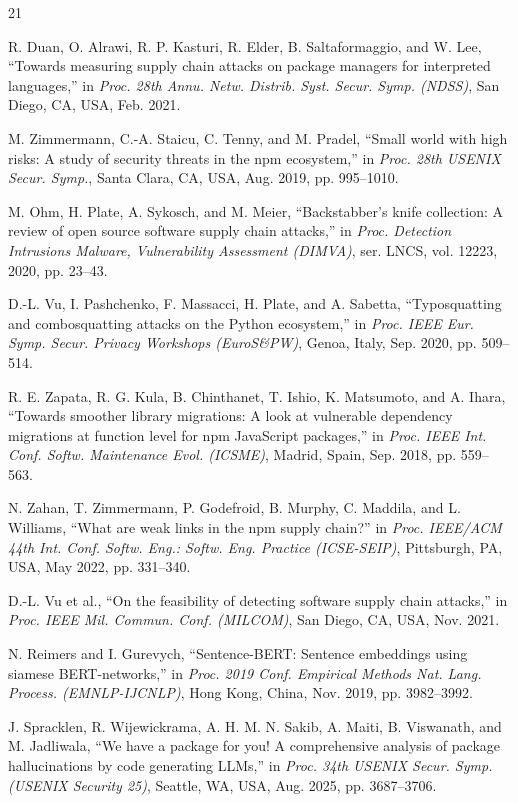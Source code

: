 \documentclass[journal]{IEEEtran}
\begin{document}
\begin{thebibliography}{21}

 R. Duan, O. Alrawi, R. P. Kasturi, R. Elder, B. Saltaformaggio, and W. Lee, ``Towards
measuring supply chain attacks on package managers for interpreted languages,'' in \emph{Proc. 28th Annu.
Netw. Distrib. Syst. Secur. Symp. (NDSS)}, San Diego, CA, USA, Feb. 2021.

 M. Zimmermann, C.-A. Staicu, C. Tenny, and M. Pradel, ``Small world with high
risks: A study of security threats in the npm ecosystem,'' in \emph{Proc. 28th USENIX Secur. Symp.}, Santa
Clara, CA, USA, Aug. 2019, pp. 995--1010.

 M. Ohm, H. Plate, A. Sykosch, and M. Meier, ``Backstabber's knife collection: A review of
open source software supply chain attacks,'' in \emph{Proc. Detection Intrusions Malware, Vulnerability
Assessment (DIMVA)}, ser. LNCS, vol. 12223, 2020, pp. 23--43.

 D.-L. Vu, I. Pashchenko, F. Massacci, H. Plate, and A. Sabetta, ``Typosquatting and
combosquatting attacks on the Python ecosystem,'' in \emph{Proc. IEEE Eur. Symp. Secur. Privacy Workshops
(EuroS\&PW)}, Genoa, Italy, Sep. 2020, pp. 509--514.

 R. E. Zapata, R. G. Kula, B. Chinthanet, T. Ishio, K. Matsumoto, and A. Ihara,
``Towards smoother library migrations: A look at vulnerable dependency migrations at function level for npm
JavaScript packages,'' in \emph{Proc. IEEE Int. Conf. Softw. Maintenance Evol. (ICSME)}, Madrid, Spain, Sep.
2018, pp. 559--563.

 N. Zahan, T. Zimmermann, P. Godefroid, B. Murphy, C. Maddila, and L. Williams, ``What
are weak links in the npm supply chain?'' in \emph{Proc. IEEE/ACM 44th Int. Conf. Softw. Eng.: Softw. Eng.
Practice (ICSE-SEIP)}, Pittsburgh, PA, USA, May 2022, pp. 331--340.

 D.-L. Vu et al., ``On the feasibility of detecting software supply chain attacks,'' in
\emph{Proc. IEEE Mil. Commun. Conf. (MILCOM)}, San Diego, CA, USA, Nov. 2021.

 N. Reimers and I. Gurevych, ``Sentence-BERT: Sentence embeddings using siamese
BERT-networks,'' in \emph{Proc. 2019 Conf. Empirical Methods Nat. Lang. Process. (EMNLP-IJCNLP)}, Hong Kong,
China, Nov. 2019, pp. 3982--3992.

 J. Spracklen, R. Wijewickrama, A. H. M. N. Sakib, A. Maiti, B. Viswanath, and M.
Jadliwala, ``We have a package for you! A comprehensive analysis of package hallucinations by code
generating LLMs,'' in \emph{Proc. 34th USENIX Secur. Symp. (USENIX Security 25)}, Seattle, WA, USA, Aug.
2025, pp. 3687--3706.


\end{thebibliography}
\end{document}
